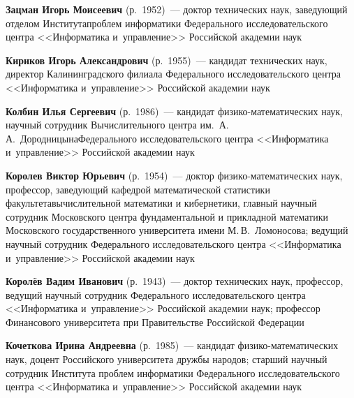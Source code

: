 \begin{multicols}{2}
\smallskip  

\noindent
\textbf{Зацман Игорь Моисеевич} (р.\ 1952)~--- доктор технических наук, заведующий отделом 
Института\linebreak проблем информатики Федерального исследовательского центра <<Информатика 
и~управ\-ле\-ние>> Российской академии наук

\smallskip  

\noindent
\textbf{Кириков Игорь Александрович} (р.\ 1955)~--- кандидат технических наук, директор 
Калининградского филиала Федерального исследовательского цент\-ра <<Информатика 
и~управ\-ле\-ние>> Российской академии наук

\smallskip  

\noindent
\textbf{Колбин Илья Сергеевич} (р.\ 1986)~--- кандидат фи\-зи\-ко-ма\-те\-ма\-ти\-че\-ских 
наук, научный сотрудник Вычислительного цент\-ра им.\ А.\,А.~Дородницына\linebreak Федерального 
исследовательского цент\-ра 
<<Информатика и~управ\-ле\-ние>> Российской академии наук

\smallskip  

\noindent
\textbf{Королев Виктор Юрьевич} (р.\ 1954)~--- доктор фи\-зи\-ко-ма\-те\-ма\-ти\-че\-ских наук, 
профессор, за\-ве\-ду\-ющий кафедрой математической статистики факультета\linebreak вычислительной 
математики и кибернетики, глав\-ный научный сотрудник Московского центра фундаментальной и 
прикладной математики Мос\-ков\-ско\-го государственного университета имени М.\,В.~Ломоносова; 
ведущий научный сотрудник Федерального исследовательского центра <<Информатика 
и~управ\-ле\-ние>> Российской академии наук

\smallskip  

\noindent
\textbf{Королёв Вадим Иванович} (р.\ 1943)~--- доктор технических наук, профессор, ведущий 
научный сотрудник Федерального исследовательского  цент\-ра <<Информатика и~управ\-ле\-ние>> 
Российской академии наук; профессор Финансового университета при Правительстве Российской 
Федерации


\def\leftkol{ОБ АВТОРАХ}

\def\rightkol{ОБ АВТОРАХ}

\smallskip  

\noindent
\textbf{Кочеткова Ирина Андреевна} (р.\ 1985)~--- кандидат фи\-зи\-ко-ма\-те\-ма\-ти\-че\-ских наук, 
доцент Российского университета дружбы народов; старший научный сотрудник Института проблем 
информатики Федерального исследовательского центра <<Информатика и~управ\-ле\-ние>> 
Российской академии наук


\end{multicols}
